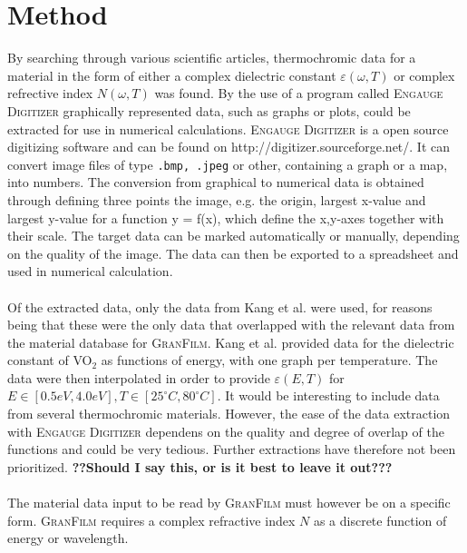 \section{\textbf{Method}}
By searching through various scientific articles, thermochromic data for a material in the 
form of either a complex dielectric constant $\varepsilon (\omega,T)$ or complex refrective index 
$N(\omega, T)$ was found. By the use of a program called \textsc{Engauge Digitizer} graphically represented
data, such as graphs or plots, could be extracted for use in numerical calculations. \textsc{Engauge Digitizer}
is a open source digitizing software and can be found on
http://digitizer.sourceforge.net/.
It can convert image files of type \texttt{.bmp, .jpeg} or other,
containing a graph or a map, into numbers. The conversion from graphical to numerical data
is obtained through defining three 
points the image, e.g. the origin, largest x-value and largest y-value for a function y = f(x),
which define the x,y-axes together with their scale. 
The target data can be marked automatically or manually, depending on the quality of the image. 
The data can then be exported to a spreadsheet and used in numerical calculation.
\\
\\
Of the extracted data, only the data from Kang et al. \cite[p.~3]{Kang2012} were used,
for reasons being that these were the only data that overlapped with the relevant data from
the material database for \textsc{GranFilm}. Kang et al. provided data for the dielectric constant
of VO$_2$ as functions of energy, with one graph per temperature. The data were then interpolated in 
order to provide $\varepsilon(E,T)$ for $E \in [0.5eV,4.0eV], T \in [25^{\circ}C, 80^{\circ}C]$.
It would be interesting to include data from several thermochromic materials. However, the
ease of the data extraction with \textsc{Engauge Digitizer} dependens on the quality and 
degree of overlap of the functions and could be very tedious. 
Further extractions have therefore not been prioritized. \textbf{??Should I say this, or is it best to leave it out???}
\\
\\
The material data input to be read by \textsc{GranFilm} must however be on a specific form. 
\textsc{GranFilm} requires a complex refractive index $N$ as a discrete function of energy or wavelength. 

